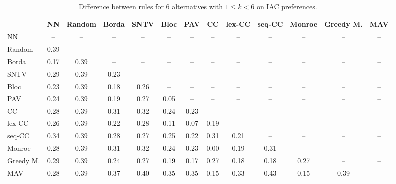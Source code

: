 
\begin{table*}[htbp]
\centering
\begin{tabular}{lcccccccccccc}
\toprule
 & NN & Random & Borda & SNTV & Bloc & PAV & CC & lex-CC & seq-CC & Monroe & Greedy M. & MAV \\
\midrule
NN & -- & -- & -- & -- & -- & -- & -- & -- & -- & -- & -- & -- \\
Random & \cellcolor{blue!39} 0.39 & -- & -- & -- & -- & -- & -- & -- & -- & -- & -- & -- \\
Borda & \cellcolor{blue!17} 0.17 & \cellcolor{blue!39} 0.39 & -- & -- & -- & -- & -- & -- & -- & -- & -- & -- \\
SNTV & \cellcolor{blue!28} 0.29 & \cellcolor{blue!39} 0.39 & \cellcolor{blue!23} 0.23 & -- & -- & -- & -- & -- & -- & -- & -- & -- \\
Bloc & \cellcolor{blue!23} 0.23 & \cellcolor{blue!39} 0.39 & \cellcolor{blue!18} 0.18 & \cellcolor{blue!26} 0.26 & -- & -- & -- & -- & -- & -- & -- & -- \\
PAV & \cellcolor{blue!24} 0.24 & \cellcolor{blue!39} 0.39 & \cellcolor{blue!19} 0.19 & \cellcolor{blue!27} 0.27 & \cellcolor{blue!5} 0.05 & -- & -- & -- & -- & -- & -- & -- \\
CC & \cellcolor{blue!28} 0.28 & \cellcolor{blue!39} 0.39 & \cellcolor{blue!31} 0.31 & \cellcolor{blue!32} 0.32 & \cellcolor{blue!24} 0.24 & \cellcolor{blue!23} 0.23 & -- & -- & -- & -- & -- & -- \\
lex-CC & \cellcolor{blue!26} 0.26 & \cellcolor{blue!39} 0.39 & \cellcolor{blue!22} 0.22 & \cellcolor{blue!28} 0.28 & \cellcolor{blue!11} 0.11 & \cellcolor{blue!7} 0.07 & \cellcolor{blue!19} 0.19 & -- & -- & -- & -- & -- \\
seq-CC & \cellcolor{blue!34} 0.34 & \cellcolor{blue!39} 0.39 & \cellcolor{blue!28} 0.28 & \cellcolor{blue!27} 0.27 & \cellcolor{blue!25} 0.25 & \cellcolor{blue!22} 0.22 & \cellcolor{blue!31} 0.31 & \cellcolor{blue!21} 0.21 & -- & -- & -- & -- \\
Monroe & \cellcolor{blue!28} 0.28 & \cellcolor{blue!39} 0.39 & \cellcolor{blue!31} 0.31 & \cellcolor{blue!32} 0.32 & \cellcolor{blue!24} 0.24 & \cellcolor{blue!23} 0.23 & \cellcolor{blue!0} 0.00 & \cellcolor{blue!19} 0.19 & \cellcolor{blue!31} 0.31 & -- & -- & -- \\
Greedy M. & \cellcolor{blue!28} 0.29 & \cellcolor{blue!39} 0.39 & \cellcolor{blue!24} 0.24 & \cellcolor{blue!27} 0.27 & \cellcolor{blue!19} 0.19 & \cellcolor{blue!17} 0.17 & \cellcolor{blue!27} 0.27 & \cellcolor{blue!18} 0.18 & \cellcolor{blue!18} 0.18 & \cellcolor{blue!27} 0.27 & -- & -- \\
MAV & \cellcolor{blue!28} 0.28 & \cellcolor{blue!39} 0.39 & \cellcolor{blue!37} 0.37 & \cellcolor{blue!40} 0.40 & \cellcolor{blue!35} 0.35 & \cellcolor{blue!35} 0.35 & \cellcolor{blue!15} 0.15 & \cellcolor{blue!33} 0.33 & \cellcolor{blue!43} 0.43 & \cellcolor{blue!15} 0.15 & \cellcolor{blue!39} 0.39 & -- \\
\bottomrule
\end{tabular}

\caption{Difference between rules for 6 alternatives with $1 \leq k < 6$ on IAC preferences.}
\label{tab:rule_distance_heatmap-m=[6]-pref_dist=IAC}
\end{table*}
    